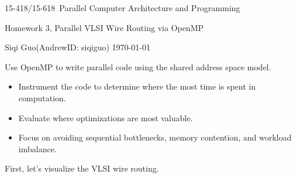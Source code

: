 \documentclass[letterpaper,11pt]{exam}
\newcommand{\num}{3}
\newcommand{\topic}{Homework \num, Parallel VLSI Wire Routing via OpenMP}
\newcommand{\coursenum}{15-418/15-618}
\newcommand{\coursename}{\coursenum\ Parallel Computer Architecture and Programming}
\newcommand{\fullname}{Siqi Guo}
\newcommand{\andrew}{AndrewID: siqiguo}
\begin{document}
\begin{center}
    {\LARGE\coursename\par}
    {\Large\topic\par}
    \fullname (\andrew) \hfill \today
\end{center}
\printanswers

\vspace{-0.2cm}
Use OpenMP to write parallel code using the shared address space model.
\vspace{-0.5cm}
\begin{itemize}[itemsep=0.1pt]
    \item Instrument the code to determine where the most time is spent in computation.
    \item Evaluate where optimizations are most valuable.
    \item Focus on avoiding sequential bottlenecks, memory contention, and workload imbalance.
\end{itemize}

First, let's visualize the VLSI wire routing.
\end{document}
